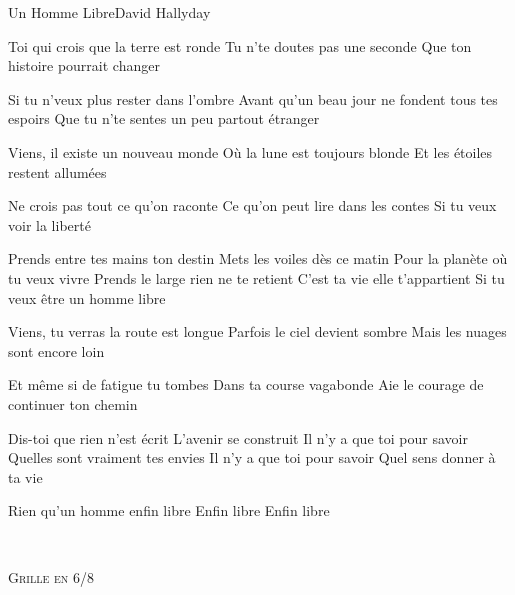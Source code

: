 \begin{Song}{Un Homme Libre}{David Hallyday}
\begin{multicols}{2}
\begin{Verse}
Toi qui crois que la terre est ronde
Tu n'te doutes pas une seconde
Que ton histoire pourrait changer
\espaceInterStrophe

Si tu n'veux plus rester dans l'ombre
Avant qu'un beau jour ne fondent tous tes espoirs
Que tu n'te sentes un peu partout étranger
\espaceInterStrophe

Viens, il existe un nouveau monde
Où la lune est toujours blonde
Et les étoiles restent allumées
\espaceInterStrophe

Ne crois pas tout ce qu'on raconte
Ce qu'on peut lire dans les contes
Si tu veux voir la liberté
\end{Verse}
\espaceInterStrophe

\begin{Chorus}
Prends entre tes mains ton destin
Mets les voiles dès ce matin
Pour la planète où tu veux vivre
Prends le large rien ne te retient
C'est ta vie elle t'appartient
Si tu veux être un homme libre
\end{Chorus}
\espaceInterStrophe

\begin{Verse}
Viens, tu verras la route est longue
Parfois le ciel devient sombre
Mais les nuages sont encore loin
\espaceInterStrophe

Et même si de fatigue tu tombes
Dans ta course vagabonde
Aie le courage de continuer ton chemin
\end{Verse}
\espaceInterStrophe

\begin{Bridge}
Dis-toi que rien n'est écrit
L'avenir se construit
Il n'y a que toi pour savoir
Quelles sont vraiment tes envies
Il n'y a que toi pour savoir
Quel sens donner à ta vie
\end{Bridge}
\espaceInterStrophe

\aurefrain
\espaceInterStrophe

\begin{Chorus}
Rien qu'un homme enfin libre
Enfin libre
Enfin libre
\end{Chorus}
\vfill
~
\end{multicols}

\vfill

\begin{multicols}{2}

\textsc{Grille en 6/8}\\


\end{multicols}
\end{Song}
